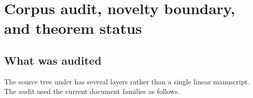\documentclass[11pt]{article}
\numberwithin{equation}{section}
\theoremstyle{definition}
\theoremstyle{remark}
\begin{document}
\begin{abstract}
Finally, the reciprocal infinite sinc product yields an all-orders expansion of the ordinary prefix, and the geometric error scale $q=1/4$ produces a new Richardson family whose weights are Gaussian $q$-binomial coefficients.  These results supply a direct four-way bridge:
\[
\begin{gathered}
\text{Thue--Morse plateaux}
\longleftrightarrow
\text{positive quadrature kernels}\\
\longleftrightarrow
\text{reciprocal sinc coefficients}
\longleftrightarrow
q\text{-binomial acceleration}.
\end{gathered}
\]
All proofs are given in ordinary analysis, with exact rational and high-precision checks.  The results are new relative to the audited corpus.  The finite geometric \(q\)-binomial/Lagrange bridge identified below now has matching Lean declarations; the analytic approximation, error, remainder, conditioning, and convergence theorems are not thereby claimed formalized or externally peer reviewed.
\end{abstract}

\tableofcontents
\newpage

\section{Corpus audit, novelty boundary, and theorem status}
\label{sec:audit}

\subsection{What was audited}

The source tree under  has several layers rather than a single linear manuscript.  The audit used the current document families as follows.
\end{document}
